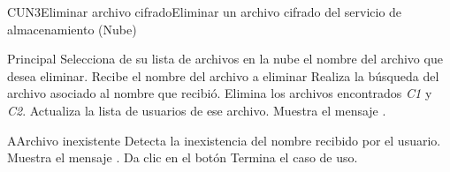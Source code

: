 


\begin{UseCase}{CUN3}{Eliminar archivo cifrado}{Eliminar un archivo cifrado del servicio de almacenamiento (Nube)}

\end{UseCase}


\begin{UCtrayectoria}{Principal}
	\UCpaso [\UCactor] Selecciona de su lista de archivos en la nube el nombre del archivo que desea eliminar.
	\UCpaso Recibe el nombre del archivo a eliminar
	\UCpaso Realiza la búsqueda del archivo asociado al nombre que recibió.  
	\UCpaso Elimina los archivos encontrados \textit{C1} y \textit{C2}.
	\UCpaso Actualiza la lista de usuarios de ese archivo.
	\UCpaso Muestra el mensaje .	
\end{UCtrayectoria}


		
\begin{UCtrayectoriaA}{A}{Archivo inexistente}
	\UCpaso Detecta la inexistencia del nombre recibido por el usuario. 
	\UCpaso  Muestra el mensaje .	
	\UCpaso[\UCactor]  Da clic en el botón \IUbuttonAceptar
	\UCpaso Termina el caso de uso.
\end{UCtrayectoriaA}
